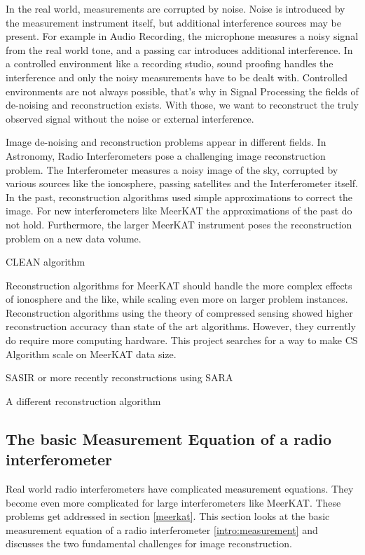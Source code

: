 In the real world, measurements are corrupted by noise. Noise is introduced by the measurement instrument itself, but additional interference sources may be present. For example in Audio Recording, the microphone measures a noisy signal from the real world tone, and a passing car introduces additional interference. In a controlled environment like a recording studio, sound proofing handles the interference and only the noisy measurements have to be dealt with. Controlled environments are not always possible, that's why in Signal Processing the fields of de-noising and reconstruction exists. With those, we want to reconstruct the truly observed signal without the noise or external interference.

Image de-noising and reconstruction problems appear in different fields. In Astronomy, Radio Interferometers pose a challenging image reconstruction problem. The Interferometer measures a noisy image of the sky, corrupted by various sources like the ionosphere, passing satellites and the Interferometer itself. In the past, reconstruction algorithms used simple approximations to correct the image. For new interferometers like MeerKAT the approximations of the past do not hold. Furthermore, the larger MeerKAT instrument poses the reconstruction problem on a new data volume.

CLEAN algorithm\cite{rich2008multi}\cite{rau2011multi}

Reconstruction algorithms for MeerKAT should handle the more complex effects of ionosphere and the like, while scaling even more on larger problem instances. Reconstruction algorithms using the theory of compressed sensing\cite{candes2006robust}\cite{donoho2006compressed} showed higher reconstruction accuracy than state of the art algorithms. However, they currently do require more computing hardware. This project searches for a way to make CS Algorithm scale on MeerKAT data size.

SASIR\cite{girard2015sparse} or more recently reconstructions using SARA \cite{dabbech2018cygnus} \cite{birdi2018sparse}



A different reconstruction algorithm

\subsection{The basic Measurement Equation of a radio interferometer}\label{intro:basic}
Real world radio interferometers have complicated measurement equations. They become even more complicated for large interferometers like MeerKAT. These problems get addressed in section \ref{meerkat}. This section looks at the basic measurement equation of a radio interferometer \eqref{intro:measurement} and discusses the two fundamental challenges for image reconstruction. 

